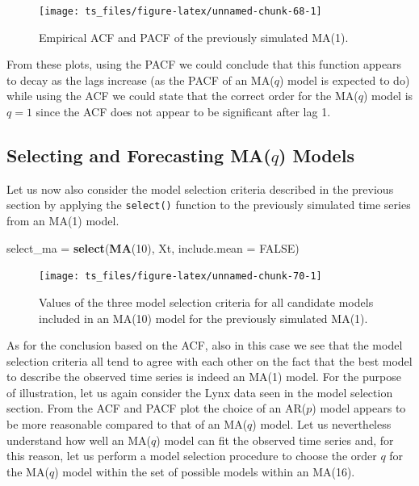 \documentclass[]{book}
\newenvironment{Shaded}{\begin{snugshade}}{\end{snugshade}}
\newcommand{\KeywordTok}[1]{\textcolor[rgb]{0.13,0.29,0.53}{\textbf{#1}}}
\newcommand{\DataTypeTok}[1]{\textcolor[rgb]{0.13,0.29,0.53}{#1}}
\newcommand{\DecValTok}[1]{\textcolor[rgb]{0.00,0.00,0.81}{#1}}
\newcommand{\StringTok}[1]{\textcolor[rgb]{0.31,0.60,0.02}{#1}}
\newcommand{\OtherTok}[1]{\textcolor[rgb]{0.56,0.35,0.01}{#1}}
\newcommand{\NormalTok}[1]{#1}
\theoremstyle{definition}
\theoremstyle{definition}
\theoremstyle{definition}
\theoremstyle{remark}
\begin{document}
\begin{figure}

{\centering \texttt{[image: ts\_files/figure-latex/unnamed-chunk-68-1]} 

}

\caption{Empirical ACF and PACF of the previously simulated MA(1).}\label{fig:unnamed-chunk-68}
\end{figure}

From these plots, using the PACF we could conclude that this function
appears to decay as the lags increase (as the PACF of an MA(\(q\)) model
is expected to do) while using the ACF we could state that the correct
order for the MA(\(q\)) model is \(q = 1\) since the ACF does not appear
to be significant after lag 1.

\subsection{\texorpdfstring{Selecting and Forecasting MA(\(q\))
Models}{Selecting and Forecasting MA(q) Models}}\label{selecting-and-forecasting-maq-models}

Let us now also consider the model selection criteria described in the
previous section by applying the \texttt{select()} function to the
previously simulated time series from an MA(1) model.

\begin{Shaded}
\begin{Highlighting}[]
\NormalTok{select_ma =}\StringTok{ }\KeywordTok{select}\NormalTok{(}\KeywordTok{MA}\NormalTok{(}\DecValTok{10}\NormalTok{), Xt, }\DataTypeTok{include.mean =} \OtherTok{FALSE}\NormalTok{)}
\end{Highlighting}
\end{Shaded}

\begin{figure}

{\centering \texttt{[image: ts\_files/figure-latex/unnamed-chunk-70-1]} 

}

\caption{Values of the three model selection criteria for all candidate models included in an MA(10) model for the previously simulated MA(1).}\label{fig:unnamed-chunk-70}
\end{figure}

As for the conclusion based on the ACF, also in this case we see that
the model selection criteria all tend to agree with each other on the
fact that the best model to describe the observed time series is indeed
an MA(1) model. For the purpose of illustration, let us again consider
the Lynx data seen in the model selection section. From the ACF and PACF
plot the choice of an AR(\(p\)) model appears to be more reasonable
compared to that of an MA(\(q\)) model. Let us nevertheless understand
how well an MA(\(q\)) model can fit the observed time series and, for
this reason, let us perform a model selection procedure to choose the
order \(q\) for the MA(\(q\)) model within the set of possible models
within an MA(16).
\end{document}
